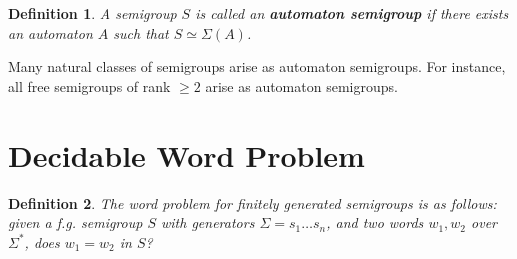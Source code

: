 \documentclass[a0]{a0poster}
\newcommand*{\concourse}{}
\theoremstyle{pleasant}
\newtheorem{definition}{Definition}
\newcommand{\0}{\underline{0}}
\newcommand{\1}{\underline{1}}
\newcommand{\2}{\underline{2}}
\renewcommand{\S}{\mathcal{S}}
\begin{document}
\begin{multicols}{3}
\begin{definition}
A semigroup $S$ is called an \textbf{automaton semigroup} if there exists an automaton $A$ such that $S \simeq \Sigma(A)$.
\end{definition}

Many natural classes of semigroups arise as automaton semigroups. For instance, all free semigroups of rank $\geq 2$ arise as automaton semigroups. 


\section*{Decidable Word Problem}

\begin{definition} 
The word problem for finitely generated semigroups is as follows: given a f.g. semigroup $S$ with generators $\Sigma = s_1 \ldots s_n$, and two words $w_1, w_2$ over $\Sigma^*$, does $w_1 = w_2$ in $S$?
\end{definition} 


\end{multicols}
\end{document}
